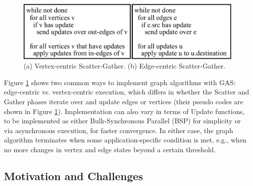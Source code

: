 \begin{figure}[!t]
\centering
\includegraphics[width=\textwidth,height=\textheight,keepaspectratio]{figures/hybrid-model.pdf}
\caption{ (a) Vertex-centric Scatter-Gather. (b) Edge-centric Scatter-Gather. }
\label{fig:vertex-edge}
\end{figure}




Figure \ref{fig:vertex-edge} shows two common ways to implement graph algorithms with GAS: edge-centric vs. vertex-centric execution, which differs in whether the
Scatter and Gather phases iterate over and update edges or vertices (their pseudo codes are shown in Figure \ref{fig:vertex-edge}).
Implementation can also vary in terms of Update functions, to be implemented as either Bulk-Synchronous Parallel (BSP) \cite{BSP}
for simplicity or via asynchronous execution, for faster convergence. In either case, the graph algorithm terminates
when some application-specific condition is met, e.g., when no more changes in vertex and edge states beyond a certain threshold. 


\subsection{Motivation and Challenges}

